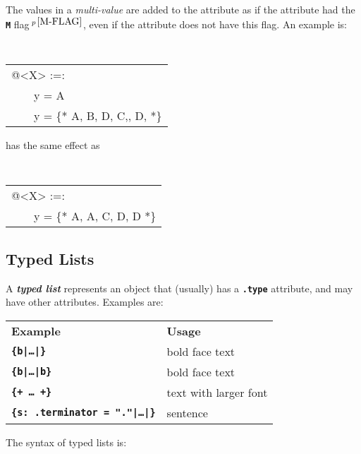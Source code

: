 \documentclass[12pt]{article}
\newcommand{\TT}[1]{{\tt \bfseries #1}}
\newcommand{\key}[1]{{\bf \em #1}\index{#1}}
\newcommand{\pagnote}[1]{$\,^{p\,\pageref{#1}}$}
\newenvironment{indpar}[1][0.3in]%
	{\begin{list}{}%
		     {\setlength{\itemsep}{0in}%
		      \setlength{\topsep}{0in}%
		      \setlength{\parsep}{1ex}%
		      \setlength{\labelwidth}{#1}%
		      \setlength{\leftmargin}{#1}%
		      \addtolength{\leftmargin}{\labelsep}}%
	 \item}%
	{\end{list}}
\begin{document}
The values in a {\em multi-value} are added to the attribute
as if the attribute had the \TT{M} flag\pagnote{M-FLAG}, even if
the attribute does not have this flag.  An example is:
\begin{indpar}
\tt
\begin{tabular}{l}
@<X> :=: \\
~~~~y = A \\
~~~~y = \{* A, B, D, C,, D, *\} \\
\end{tabular}
\end{indpar}
has the same effect as
\begin{indpar}
\tt
\begin{tabular}{l}
@<X> :=: \\
~~~~y = \{* A, A, C, D, D *\} \\
\end{tabular}
\end{indpar}

\subsection{Typed Lists}
\label{TYPED-LISTS}

A \key{typed list} represents an object that (usually) has a
\TT{.type} attribute, and may have other attributes.  Examples are:
\begin{center}
    \begin{tabular}[t]{l@{~~~~~}l}
     \bf Example & \bf Usage
     \\[1ex]
    \TT{\{b|\ldots|\}} & bold face text
    \\
    \TT{\{b|\ldots|b\}} & bold face text
    \\
    \TT{\{+ \ldots{}~+\}} & text with larger font
    \\
    \TT{\{s:~.terminator = "."|\ldots|\}} & sentence
    \\
    \end{tabular}
\end{center}

The syntax of typed lists is:
\end{document}
